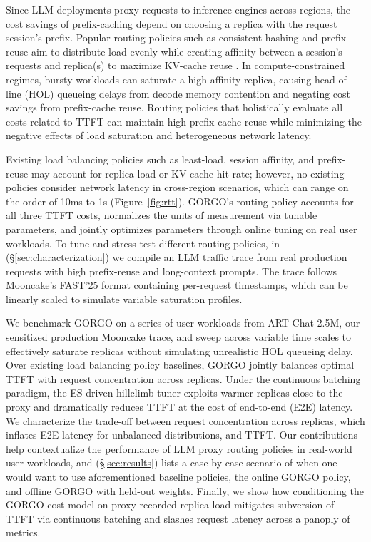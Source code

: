 \documentclass{article}
\begin{document}
Since LLM deployments proxy requests to inference engines across regions, the cost savings of prefix-caching depend on choosing a replica with the request session's prefix. Popular routing policies such as consistent hashing and prefix reuse aim to distribute load evenly while creating affinity between a session's requests and replica(s) to maximize KV-cache reuse \citep{karger1997consistent, chord2003, sglang2024, skywalker}. In compute-constrained regimes, bursty workloads can saturate a high-affinity replica, causing head-of-line (HOL) queueing delays from decode memory contention and negating cost savings from prefix-cache reuse. Routing policies that holistically evaluate all costs related to TTFT can maintain high prefix-cache reuse while minimizing the negative effects of load saturation and heterogeneous network latency.

Existing load balancing policies such as least-load, session affinity, and prefix-reuse may account for replica load or KV-cache hit rate; however, no existing policies consider network latency in cross-region scenarios, which can range on the order of 10ms to 1s (Figure~\ref{fig:rtt}). GORGO's routing policy accounts for all three TTFT costs, normalizes the units of measurement via tunable parameters, and jointly optimizes parameters through online tuning on real user workloads. To tune and stress-test different routing policies, in (\S\ref{sec:characterization}) we compile an LLM traffic trace from real production requests with high prefix-reuse and long-context prompts. The trace follows Mooncake's FAST'25 format \citep{qin2024mooncake} containing per-request timestamps, which can be linearly scaled to simulate variable saturation profiles.

We benchmark GORGO on a series of user workloads from ART-Chat-2.5M, our sensitized production Mooncake trace, and sweep across variable time scales to effectively saturate replicas without simulating unrealistic HOL queueing delay. Over existing load balancing policy baselines, GORGO jointly balances optimal TTFT with request concentration across replicas. Under the continuous batching paradigm, the ES-driven hillclimb tuner exploits warmer replicas close to the proxy and dramatically reduces TTFT at the cost of end-to-end (E2E) latency. We characterize the trade-off between request concentration across replicas, which inflates E2E latency for unbalanced distributions, and TTFT. Our contributions help contextualize the performance of LLM proxy routing policies in real-world user workloads, and (\S\ref{sec:results}) lists a case-by-case scenario of when one would want to use aforementioned baseline policies, the online GORGO policy, and offline GORGO with held-out weights. Finally, we show how conditioning the GORGO cost model on proxy-recorded replica load mitigates subversion of TTFT via continuous batching and slashes request latency across a panoply of metrics.
\end{document}
